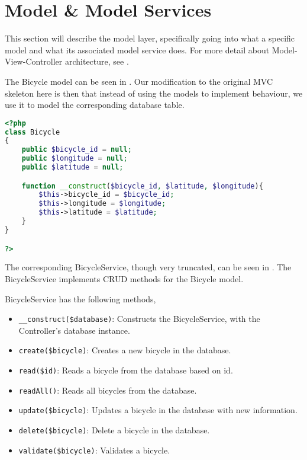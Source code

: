 \section{Model \& Model Services}
This section will describe the model layer, specifically going into what a specific model and what its associated model service does. For more detail about Model-View-Controller architecture, see .

The Bicycle model can be seen in . Our modification to the original MVC skeleton here is then that instead of using the models to implement behaviour, we use it to model the corresponding database table.

\begin{minipage}{\textwidth}
\begin{lstlisting}[language=php, label=lst:bicycleModel, caption={Bicycle Class}]
<?php
class Bicycle
{
    public $bicycle_id = null;
    public $longitude = null;
    public $latitude = null;

    function __construct($bicycle_id, $latitude, $longitude){
        $this->bicycle_id = $bicycle_id;
        $this->longitude = $longitude;
        $this->latitude = $latitude;
    }
}

?>
\end{lstlisting}
\end{minipage}

The corresponding BicycleService, though very truncated, can be seen in . The BicycleService implements CRUD methods for the Bicycle model.

BicycleService has the following methods,

\begin{itemize}
\item \lstinline|__construct($database)|: Constructs the BicycleService, with the Controller's database instance.
\item \lstinline|create($bicycle)|: Creates a new bicycle in the database.
\item \lstinline|read($id)|: Reads a bicycle from the database based on id.
\item \lstinline|readAll()|: Reads all bicycles from the database.
\item \lstinline|update($bicycle)|: Updates a bicycle in the database with new information.
\item \lstinline|delete($bicycle)|: Delete a bicycle in the database.
\item \lstinline|validate($bicycle)|: Validates a bicycle.
\end{itemize}

